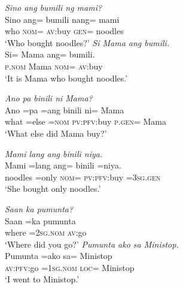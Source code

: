 \documentclass[output=paper]{langsci/langscibook}
\begin{document}
\begin{exe}
	\ex\label{c}
	\begin{xlist}
		 \textit{Sino ang bumili ng mami?}\\
		\gll Sino  ang=  b{\USSmaller}um{\USGreater}ili  nang=  mami{\USQMark}\\
		who  \textsc{nom}=  \textsc{av}:buy    \textsc{gen}=  noodles\\
		\glt ‘Who bought noodles?’
		  \textit{Si Mama ang bumili.}\\
		\gll Si=  Mama  ang=  b{\USSmaller}um{\USGreater}ili.\\
		\textsc{p}.\textsc{nom}  Mama  \textsc{nom}=  \textsc{av}:buy\\
		\glt ‘It is Mama who bought noodles.’
	\end{xlist}
\end{exe}

\begin{exe}
	\ex\label{d}
	\begin{xlist}
		 \textit{Ano pa binili ni Mama?}\\
		\gll Ano  =pa  {\USOParen}=ang{\USCParen}  b{\USSmaller}in{\USGreater}ili  ni=  Mama{\USQMark}\\
		what  =else  =\textsc{nom}  \textsc{pv}:\textsc{pfv}:buy  \textsc{p}.\textsc{gen}=  Mama\\
		\glt ‘What else did Mama buy?’
		
		\newpage 
		  \textit{Mami lang ang binili niya.}\\
		\gll Mami    =lang  ang=  b{\USSmaller}in{\USGreater}ili  =niya.\\
		noodles  =only  \textsc{nom}=  \textsc{pv}:\textsc{pfv}:buy  =\textsc{3sg}.\textsc{gen}\\
		\glt ‘She bought only noodles.’
	\end{xlist}
\end{exe}

\begin{exe}
	\ex\label{e}
	\begin{xlist}
		 \textit{Saan ka pumunta?}\\
		\gll Saan  =ka    p{\USSmaller}um{\USGreater}unta{\USQMark}\\
		where  =\textsc{2sg}.\textsc{nom}  \textsc{av}:go\\
		\glt ‘Where did you go?’
		  \textit{Pumunta ako sa Ministop.}\\
		\gll P{\USSmaller}um{\USGreater}unta  =ako    sa=  Ministop\\
		\textsc{av}:\textsc{pfv}:go  =\textsc{1sg}.\textsc{nom}  \textsc{loc}=  Ministop\\
		\glt ‘I went to Ministop.’
	\end{xlist}
\end{exe}
\end{document}
